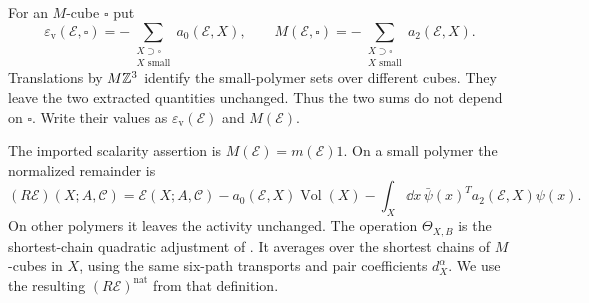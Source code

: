 For an $M$-cube $\square$ put
\begin{equation}\label{eq:rg-counterterm-maps}
 \varepsilon_{\mathrm v}(\mathscr E,\square)
          =-\sum_{\substack{X\supset\square\\X\text{ small}}}
                                                     a_0(\mathscr E,X),
 \qquad
 M(\mathscr E,\square)
          =-\sum_{\substack{X\supset\square\\X\text{ small}}}
                                                     a_2(\mathscr E,X).
\end{equation}
Translations by $M\mathbb Z^3$ identify the small-polymer sets over
different cubes. They leave the two extracted quantities
unchanged. Thus the two sums do not depend on $\square$.
Write their values as $\varepsilon_{\mathrm v}(\mathscr E)$ and
$M(\mathscr E)$.

The imported scalarity assertion is $M(\mathscr E)=m(\mathscr E)1$.
On a small polymer the normalized remainder is
\cite[(17)]{NormalizedContraction}
\begin{equation}\label{eq:rg-normalized-remainder}
 (R\mathscr E)(X;A,\mathscr C)=\mathscr E(X;A,\mathscr C)
 -a_0(\mathscr E,X)\operatorname{Vol}(X)
 -\int_X\dd x\,\bar\psi(x)^Ta_2(\mathscr E,X)\psi(x).
\end{equation}
On other polymers it leaves the activity unchanged.
The operation $\Theta_{X,B}$ is the
shortest-chain quadratic adjustment of \cite[\S3.2]{NormalizedContraction}.
It averages over the shortest chains of $M$-cubes in $X$, using the
same six-path transports and pair coefficients $d_X^\alpha$.
We use the resulting $(R\mathscr E)^{\mathrm{nat}}$ from that definition.


